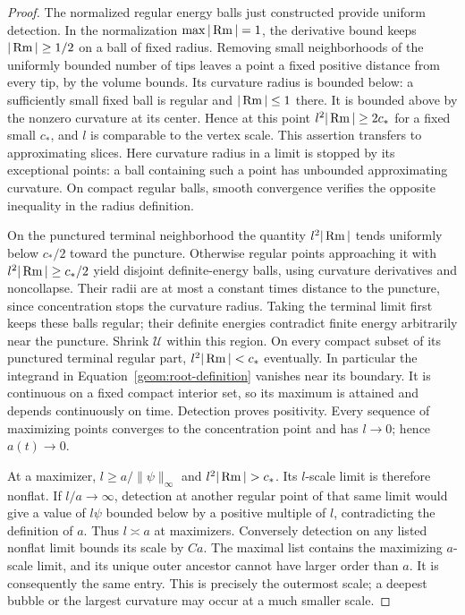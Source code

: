 \begin{proof}
The normalized regular energy balls just constructed provide uniform
detection. In the normalization $\max|\operatorname{Rm}|=1$, the derivative bound
keeps $|\operatorname{Rm}|\ge1/2$ on a ball of fixed radius. Removing small
neighborhoods of the uniformly bounded number of tips leaves a point
a fixed positive distance from every tip, by the volume bounds.
Its curvature radius is bounded below: a sufficiently small fixed
ball is regular and $|\operatorname{Rm}|\le1$ there. It is bounded above by the
nonzero curvature at its center. Hence at this point
$l^2|\operatorname{Rm}|\geq2c_*$ for a fixed small $c_*$, and $l$ is comparable
to the vertex scale. This assertion transfers to approximating slices.
Here curvature radius in a limit is stopped by its exceptional
points: a ball containing such a point has unbounded approximating
curvature. On compact regular balls, smooth convergence verifies
the opposite inequality in the radius definition.

On the punctured terminal neighborhood the quantity $l^2|\operatorname{Rm}|$
tends uniformly below $c_*/2$ toward the puncture. Otherwise regular
points approaching it with $l^2|\operatorname{Rm}|\geq c_*/2$ yield disjoint
definite-energy balls, using curvature derivatives and noncollapse.
Their radii are at most a constant times distance to the puncture,
since concentration stops the curvature radius. Taking the
terminal limit first keeps these balls regular; their definite
energies contradict finite energy arbitrarily near the puncture.
Shrink $\mathcal U$ within this region. On every compact subset of
its punctured terminal regular part, $l^2|\operatorname{Rm}|<c_*$ eventually.
In particular the integrand in Equation~\eqref{geom:root-definition}
vanishes near its boundary. It is continuous on a fixed compact
interior set, so its maximum is attained and depends continuously
on time. Detection proves positivity. Every sequence of maximizing
points converges to the concentration point and has $l\to0$;
hence $a(t)\to0$.

At a maximizer, $l\geq a/\|\psi\|_\infty$ and
$l^2|\Rm|>c_*$. Its $l$-scale limit is therefore nonflat. If
$l/a\to\infty$, detection at another regular point of that same limit
would give a value of $l\psi$ bounded below by a positive multiple
of $l$, contradicting the definition of $a$. Thus $l\asymp a$ at
maximizers. Conversely detection on any listed nonflat limit bounds
its scale by $Ca$. The maximal list contains the maximizing
$a$-scale limit, and its unique outer ancestor cannot have larger
order than $a$. It is consequently the same entry. This is precisely
the outermost scale; a deepest bubble or the largest curvature may
occur at a much smaller scale.
\end{proof}

